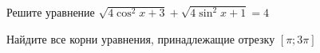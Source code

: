 \begin{ex}
	\begin{condition}
		\begin{enumcols}[label=\asbuk*)]
			\item Решите уравнение \( \sqrt{4\cos^2 x + 3} + \sqrt{4\sin^2 x + 1}  = 4 \)
			\item Найдите все корни уравнения, принадлежащие отрезку \( \left[\pi;3\pi\right] \)
		\end{enumcols}
	\end{condition}
\end{ex}
